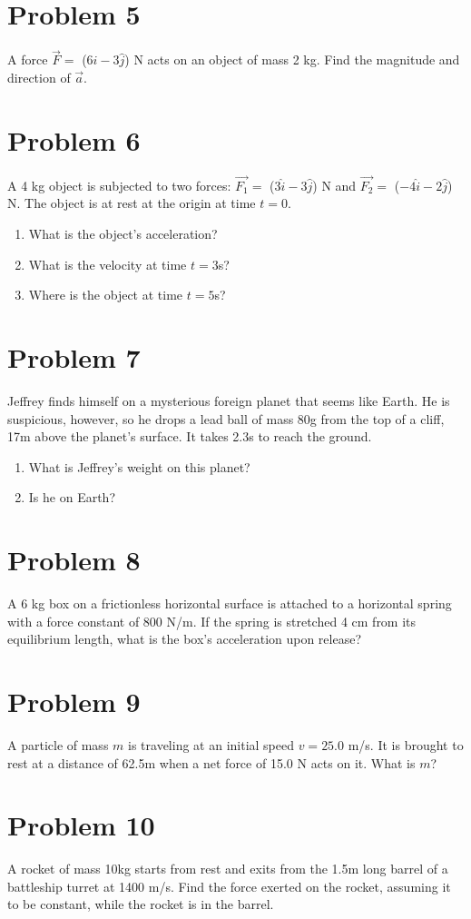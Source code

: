\documentclass[tikz,border=10pt]{article}
\begin{document}
\section*{Problem 5}
A force $\Vec{F} =$ ($6 \hat{i} - 3 \hat{j}$) N acts on an object of mass 2 kg. Find the magnitude and direction of $\Vec{a}$.

\section*{Problem 6}
A 4 kg object is subjected to two forces: $\Vec{F_1} =$ ($3 \hat{i} - 3 \hat{j}$) N and $\Vec{F_2} =$ ($-4 \hat{i} - 2 \hat{j}$) N. The object is at rest at the origin at time $t = 0$.
\begin{enumerate}
    \item What is the object's acceleration?
    \item What is the velocity at time $t = 3$s?
    \item Where is the object at time $t = 5$s?
\end{enumerate}

\section*{Problem 7}
Jeffrey finds himself on a mysterious foreign planet that seems like Earth. He is suspicious, however, so he drops a lead ball of mass 80g from the top of a cliff, 17m above the planet's surface. It takes 2.3s to reach the ground.
\begin{enumerate}
    \item What is Jeffrey's weight on this planet?
    \item Is he on Earth?
\end{enumerate}

\section*{Problem 8}
A 6 kg box on a frictionless horizontal surface is attached to a horizontal spring with a force constant of 800 N/m. If the spring is stretched 4 cm from its equilibrium length, what is the box's acceleration upon release?

\section*{Problem 9}
A particle of mass $m$ is traveling at an initial speed $v = 25.0$
m/s. It is brought to rest at a distance of 62.5m when a net force of 15.0 N acts on it. What is $m$?

\section*{Problem 10}
A rocket of mass 10kg starts from rest and exits from the 1.5m long barrel of a battleship turret at 1400 m/s. Find the force exerted on the rocket, assuming it to be constant, while the rocket is in the barrel.
\end{document}
